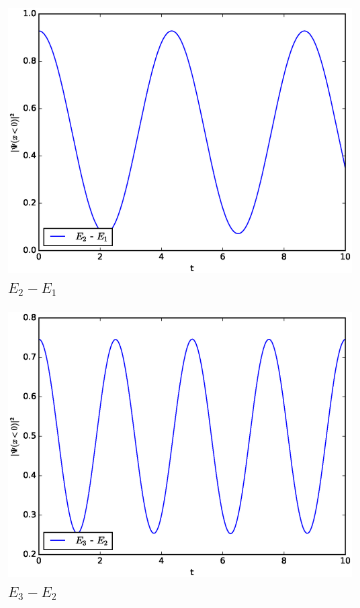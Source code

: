 \documentclass[a4paper, 11pt]{scrartcl}
\begin{document}
\begin{figure}[H]
\begin{subfigure}[b]{0.5\linewidth}
  \centering
  \includegraphics[width=0.9\linewidth]{probability_left21} 
  \caption{$E_2 - E_1$}
  \label{fig:21} 
  \vspace{4ex}
\end{subfigure}%
\begin{subfigure}[b]{0.5\linewidth}
  \centering
  \includegraphics[width=0.9\linewidth]{probability_left32} 
  \caption{$E_3 - E_2$} 
  \label{fig:32} 
  \vspace{4ex}
\end{subfigure}
\begin{subfigure}[b]{0.5\linewidth}
  \centering

\end{subfigure}
\end{figure}
\end{document}
